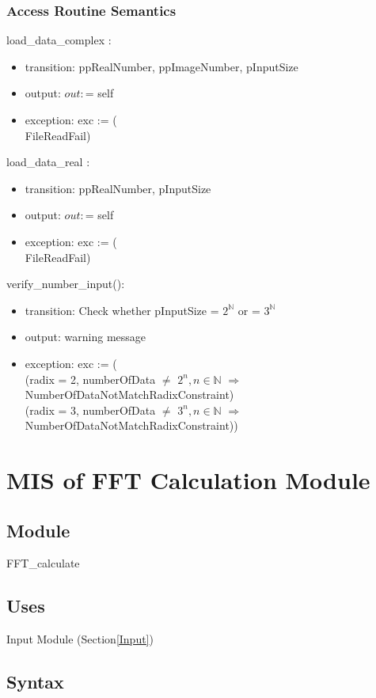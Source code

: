 \documentclass[12pt, titlepage]{article}
\begin{document}
\subsubsection{Access Routine Semantics}

load\_data\_complex :
\begin{itemize}
\item transition: ppRealNumber, ppImageNumber, pInputSize
\item output: $out:$= self
\item exception: exc := (\\
 FileReadFail)
\end{itemize}
load\_data\_real :
\begin{itemize}
\item transition: ppRealNumber, pInputSize
\item output: $out:$= self
\item exception: exc := (\\
 FileReadFail)
\end{itemize}
verify\_number\_input():
\begin{itemize}
\item transition: Check whether pInputSize = $2^{\mathbb{N}}$ or =  $3^{\mathbb{N}}$
\item output: warning message
\item exception: exc := (\\
(radix = 2, numberOfData $\neq$ $2^n, n\in \mathbb{N}$ $\Rightarrow$ NumberOfDataNotMatchRadixConstraint)\\
(radix = 3, numberOfData $\neq$ $3^n, n\in \mathbb{N}$ $\Rightarrow$ NumberOfDataNotMatchRadixConstraint))
\end{itemize}



\section{MIS of FFT Calculation Module} \label{Cal}

\subsection{Module}

FFT\_calculate

\subsection{Uses}
Input Module (Section\ref{Input})
\subsection{Syntax}
\end{document}
